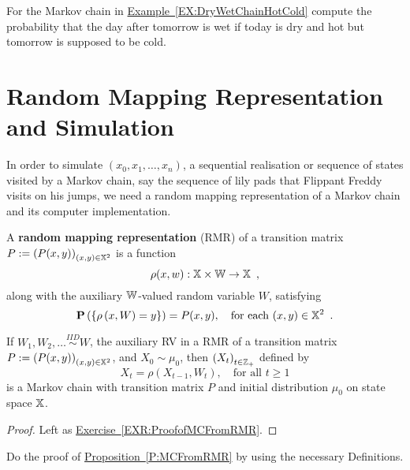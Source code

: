\begin{exercise}\label{Exr:DryWetChainHotCold}
For the Markov chain in \hyperref[EX:DryWetChainHotCold]{Example~\ref*{EX:DryWetChainHotCold}}  compute the probability that the day after tomorrow is wet if today is dry and hot but tomorrow is supposed to be cold.
\end{exercise}

\section{Random Mapping Representation and Simulation}\label{S:FiniteMCRMRandSim}

In order to simulate $(x_0,x_1,\ldots,x_n)$, a sequential realisation or sequence of states visited by a Markov chain, say the sequence of lily pads that Flippant Freddy visits on his jumps, we need a random mapping representation of a Markov chain and its computer implementation.  

\begin{definition}\label{D:RMR}
A {\bf random mapping representation} (RMR) of a transition matrix $P := \left(P(x,y)\right)_{(x,y)\in\mathbb{X}^2}$ is a function 
\begin{equation}\label{E:RMRrho}
\rho(x,w): \mathbb{X} \times \mathbb{W} \to \mathbb{X} \enspace ,
\end{equation}
along with the auxiliary $\mathbb{W}$-valued random variable $W$, satisfying
\begin{equation}\label{E:RMRProbrho}
\mathbf{P} \left( \{ \rho \left( x,W \right) = y  \} \right) = P(x,y), \quad \text{for each } (x,y) \in \mathbb{X}^2 \enspace .
\end{equation}
\end{definition}

\begin{prop}\label{P:MCFromRMR}
If $W_1,W_2,\ldots \overset{IID}{\sim} W$, the auxiliary RV in  a RMR of a transition matrix $P := \left(P(x,y)\right)_{(x,y)\in\mathbb{X}^2}$, and  $X_0 \sim \mu_0$, then $\left(X_t\right)_{t\in\mathbb{Z}_+}$ defined by
\[
X_t = \rho \left(X_{t-1},W_t\right), \quad \text{for all } t \geq 1
\]
is a Markov chain with transition matrix $P$ and initial distribution $\mu_0$ on state space $\mathbb{X}$.
\begin{proof}
Left as \hyperref[EXR:ProofofMCFromRMR]{Exercise~\ref*{EXR:ProofofMCFromRMR}}.
\end{proof}
\end{prop}

\begin{exercise}\label{EXR:ProofofMCFromRMR}
Do the proof of \hyperref[P:MCFromRMR]{Proposition~\ref*{P:MCFromRMR}} by using the necessary Definitions.
\end{exercise}


